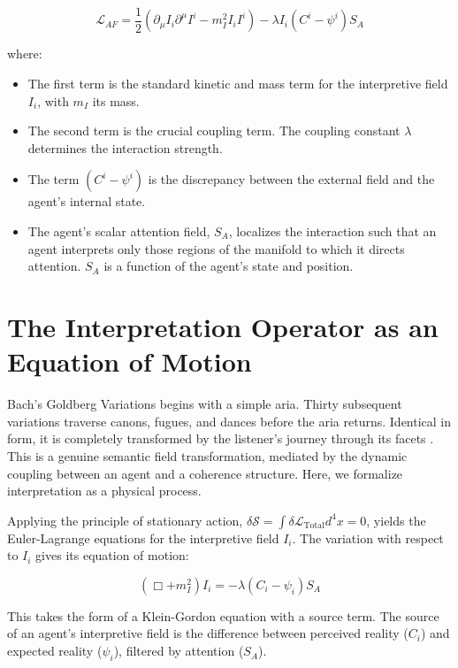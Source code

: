 \begin{equation}
\mathcal{L}_{AF} = \frac{1}{2} \left( \partial_\mu I_i \partial^\mu I^i - m_I^2 I_i I^i \right) - \lambda I_i (C^i - \psi^i) S_A
\end{equation}

where:
\begin{itemize}
    \item The first term is the standard kinetic and mass term for the interpretive field \(I_i\), with \(m_I\) its mass.
    \item The second term is the crucial coupling term. The coupling constant \(\lambda\) determines the interaction strength.
    \item The term \((C^i - \psi^i)\) is the discrepancy between the external field and the agent's internal state.
    \item The agent's scalar attention field, \(S_A\), localizes the interaction such that an agent interprets only those regions of the manifold to which it directs attention. \(S_A\) is a function of the agent's state and position.
\end{itemize}

\section{The Interpretation Operator as an Equation of Motion}

Bach's Goldberg Variations begins with a simple aria. Thirty subsequent variations traverse canons, fugues, and dances before the aria returns. Identical in form, it is completely transformed by the listener's journey through its facets \autocite{Bach1741}. This is a genuine semantic field transformation, mediated by the dynamic coupling between an agent and a coherence structure. Here, we formalize interpretation as a physical process.

Applying the principle of stationary action, \(\delta \mathcal{S} = \int \delta \mathcal{L}_{\text{Total}} d^4x = 0\), yields the Euler-Lagrange equations for the interpretive field \(I_i\). The variation with respect to \(I_i\) gives its equation of motion:

\begin{equation}
(\Box + m_I^2) I_i = -\lambda (C_i - \psi_i) S_A
\end{equation}

This takes the form of a Klein-Gordon equation with a source term. The source of an agent's interpretive field is the difference between perceived reality (\(C_i\)) and expected reality (\(\psi_i\)), filtered by attention (\(S_A\)).

